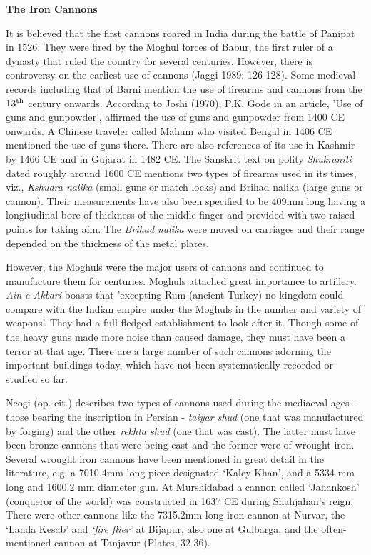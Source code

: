 \noindent \textbf{\large The Iron Cannons}

 It is believed that the first cannons roared in India during the battle of Panipat in 1526. They were fired by the Moghul forces of Babur, the first ruler of a dynasty that ruled the country for several centuries. However, there is controversy on the earliest use of cannons (Jaggi 1989: 126-128). Some medieval records including that of Barni mention the use of firearms and cannons from the $13^{\rm th}$ century onwards. According to Joshi (1970), P.K. Gode in an article, 'Use of guns and gunpowder', affirmed the use of guns and gunpowder from 1400 CE onwards. A Chinese traveler called Mahum who visited Bengal in 1406 CE mentioned the use of guns there. There are also references of its use in Kashmir by 1466 CE and in Gujarat in 1482  CE. The Sanskrit text on polity {\it Shukraniti} dated roughly around 1600  CE mentions two types of firearms used in its times, viz., {\it Kshudra nalika} (small guns or match locks) and Brihad nalika (large guns or cannon). Their measurements have also been specified to be 409mm long having a longitudinal bore of thickness of the middle finger and provided with two raised points for taking aim. The {\it Brihad nalika} were moved on carriages and their range depended on the thickness of the metal plates.

However, the Moghuls were the major users of cannons and continued to manufacture them for centuries. Moghuls attached great importance to artillery. {\it Ain-e-Akbari} boasts that 'excepting Rum (ancient Turkey) no kingdom could compare with the Indian empire under the Moghuls in the number and variety of weapons'. They had a full-fledged establishment to look after it. Though some of the heavy guns made more noise than caused damage, they must have been a terror at that age. There are a large number of such cannons adorning the important buildings today, which have not been systematically recorded or studied so far. 

Neogi (op. cit.) describes two types of cannons used during the mediaeval ages - those bearing the inscription in Persian - {\it taiyar shud} (one that was manufactured by forging) and the other {\it rekhta shud} (one that was cast). The latter must have been bronze cannons that were being cast and the former were of wrought iron. Several wrought iron cannons have been mentioned in great detail in the literature, e.g. a 7010.4mm long piece designated ‘Kaley Khan’, and a 5334 mm long and 1600.2 mm diameter gun. At Murshidabad a cannon called ‘Jahankosh’ (conqueror of the world) was constructed in 1637 CE during Shahjahan’s reign. There were other cannons like the 7315.2mm long iron cannon at Nurvar, the ‘Landa Kesab’ and {\it ‘fire flier’} at Bijapur, also one at Gulbarga, and the often-mentioned cannon at Tanjavur (Plates, 32-36).

